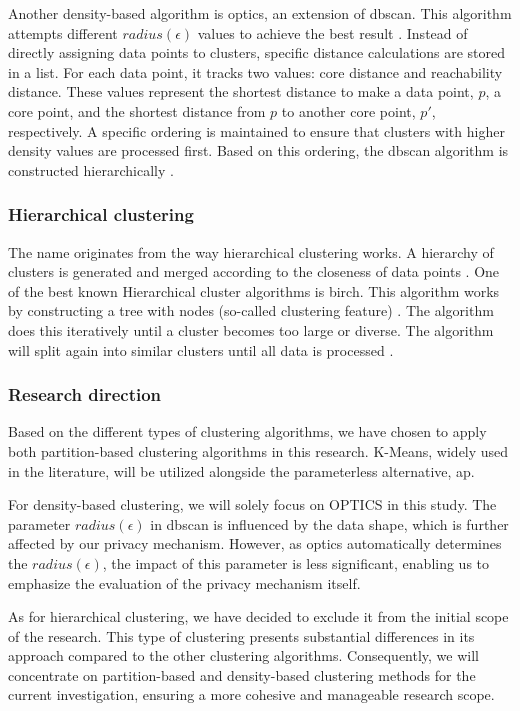 Another density-based algorithm is \gls{optics}, an extension of \gls{dbscan}.
This algorithm attempts different $radius(\epsilon)$ values to achieve the best result \citep{ankerst_optics_nodate}.
Instead of directly assigning data points to clusters, specific distance calculations are stored in a list.
For each data point, it tracks two values: core distance and reachability distance.
These values represent the shortest distance to make a data point, $p$, a core point, and the shortest distance from $p$ to another core point, $p'$, respectively.
A specific ordering is maintained to ensure that clusters with higher density values are processed first.
Based on this ordering, the \gls{dbscan} algorithm is constructed hierarchically \citep{schubert_dbscan_2017}.


\subsubsection{Hierarchical clustering}
The name originates from the way hierarchical clustering works.
A hierarchy of clusters is generated and merged according to the closeness of data points \citep{meng_private_2021}.
One of the best known Hierarchical cluster algorithms is \gls{birch}.
This algorithm works by constructing a tree with nodes (so-called clustering feature) \citep{zhang_birch_1996}.
The algorithm does this iteratively until a cluster becomes too large or diverse.
The algorithm will split again into similar clusters until all data is processed \citep{zhang_birch_1996}.

\subsubsection{Research direction}
Based on the different types of clustering algorithms, we have chosen to apply both partition-based clustering algorithms in this research.
K-Means, widely used in the literature, will be utilized alongside the parameterless alternative, \gls{ap}.

For density-based clustering, we will solely focus on OPTICS in this study.
The parameter $radius (\epsilon)$ in \gls{dbscan} is influenced by the data shape, which is further affected by our privacy mechanism.
However, as \gls{optics} automatically determines the $radius(\epsilon)$, the impact of this parameter is less significant, enabling us to emphasize the evaluation of the privacy mechanism itself.

As for hierarchical clustering, we have decided to exclude it from the initial scope of the research.
This type of clustering presents substantial differences in its approach compared to the other clustering algorithms.
Consequently, we will concentrate on partition-based and density-based clustering methods for the current investigation, ensuring a more cohesive and manageable research scope.

